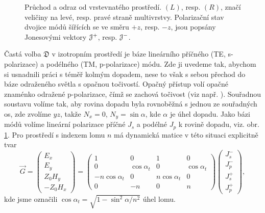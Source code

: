 \begin{figure}
    \centering
    
    \caption{Průchod a odraz od vrstevnatého prostředí. $(L)$, resp. $(R)$, značí veličiny na levé, resp. pravé straně multivrstvy. Polarizační stav dvojice módů šířících se ve směru $+z$, resp. $-z$, jsou popsány Jonesovými vektory $\mathcal{J}^+$, resp. $\mathcal{J}^-$.}
    \label{fig:odraz-pruchod}
\end{figure}

Častá volba $\mathfrak{D}$ v izotropním prostředí je báze lineárního příčného (TE, s-polarizace) a podélného (TM, p-polarizace) módu.
Zde ji uvedeme tak, abychom si usnadnili práci s téměř kolmým dopadem, nese to však s sebou přechod do báze odraženého světla s opačnou točivostí.
Opačný přístup volí opačné znaménko odražené p-polarizace, čímž se zachová točivost (viz např. \cite{silberQuadraticMagnetoopticKerr2019a}).
Souřadnou soustavu volíme tak, aby rovina dopadu byla rovnoběžná s jednou ze souřadných os, zde zvolíme $yz$, takže $N_x=0$, $N_y=\sin \alpha$, kde $\alpha$ je úhel dopadu.
Jako bázi módů volíme lineární polarizace příčné $J_s$ a podélné $J_p$ k rovině dopadu, viz. obr. \ref{fig:odraz-pruchod}.
Pro prostředí s indexem lomu $n$ má dynamická matice v této situaci explicitně tvar
\begin{equation}
    \label{eqn:D-sp}
    \vec{G} = \begin{pmatrix} E_x \\ E_y \\ Z_0 H_y \\ -Z_0 H_x \end{pmatrix}
    =\begin{pmatrix}
        1 & 0 & 1 & 0 \\
        0 & \cos\alpha_t & 0 & \cos\alpha_t \\
        -n\cos\alpha_t & 0 & n\cos\alpha_t & 0 \\
        0 & -n & 0 & n
    \end{pmatrix}
    \begin{pmatrix}
        J^-_{s} \\ J^-_{p} \\ J^+_s \\ J^+_{p} 
    \end{pmatrix} ,
\end{equation}
kde jsme označili $\cos \alpha_t = \sqrt{1-\sin^2 \alpha /n^2}$ úhel lomu.


